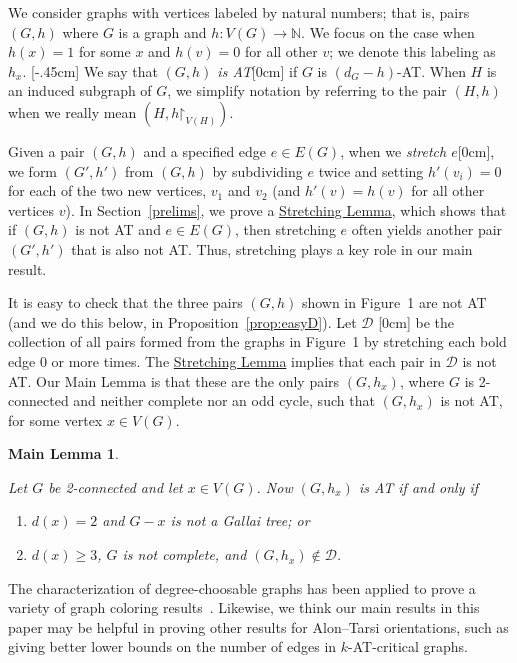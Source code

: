 \documentclass[12pt]{article}
\theoremstyle{plain}
\newtheorem*{mainthm}{Main Lemma}
\theoremstyle{definition}
\theoremstyle{remark}
\newcommand{\fancy}[1]{\mathcal{#1}}
\newcommand{\IN}{\mathbb{N}}
\newcommand{\D}{\fancy{D}}
\newcommand{\func}[3]{#1\colon #2 \rightarrow #3}
\newcommand{\parens}[1]{\left( #1 \right)}
\def\D{\fancy{D}}
\renewcommand{\restriction}{\mathord{\upharpoonright}}
\newcommand{\aside}[1]{\marginnote{\scriptsize{#1}}[0cm]}
\newcommand{\aaside}[2]{\marginnote{\scriptsize{#1}}[#2]}
\begin{document}
	\bigskip
	
	We consider graphs with vertices labeled by natural numbers; that is, pairs
	$(G,h)$ where $G$ is a graph and $\func{h}{V(G)}{\IN}$.  We focus on the case
	when $h(x)=1$ for some $x$ and $h(v)=0$ for all other $v$; we denote this
	labeling as $h_x$. \aaside{$h_x$}{-.45cm}  We say that \emph{$(G, h)$ is
		AT}\aside{$(G,h)$\\ is AT} if $G$ is $(d_G - h)$-AT.
	When $H$ is an induced subgraph of $G$, we simplify notation by referring to
	the pair $(H, h)$ when we really mean $\parens{H, h\restriction_{V(H)}}$.
	
	Given a pair $(G,h)$ and a specified edge $e\in E(G)$, when we \emph{stretch
		$e$}\aside{stretch $e$}, we form $(G',h')$ from $(G,h)$ by subdividing $e$ twice and setting
	$h'(v_i)=0$ for each of the two new vertices, $v_1$ and $v_2$ (and $h'(v)=h(v)$
	for all other vertices $v$).  In Section~\ref{prelims}, we prove a
	\hyperlink{target:SubdivideTwice}{Stretching Lemma}, which shows that if $(G,h)$ is not
	AT and $e\in E(G)$, then stretching $e$ often yields another pair $(G',h')$
	that is also not AT.  Thus, stretching plays a key role in our main result.
	
	It is easy to check that the three pairs $(G,h)$ shown in Figure~1 are not AT
	(and we do this below, in Proposition~\ref{prop:easyD}).  Let $\D$ \aside{$\D$} be the
	collection of all pairs formed from the graphs in Figure~1 by stretching each
	bold edge 0 or more times.  The \hyperlink{target:SubdivideTwice}{Stretching Lemma}
	implies that each pair in $\D$ is not AT.  Our Main Lemma is that these are
	the only pairs $(G,h_x)$, where $G$ is 2-connected and neither complete 
	nor an odd cycle, such that $(G,h_x)$ is not AT, for some vertex $x\in V(G)$.  
	
	\begin{mainthm}
		\hypertarget{target:mainLemma}{}
		Let $G$ be 2-connected and let $x \in V(G)$.
		Now $(G,h_x)$ is AT if and only if
		\begin{enumerate}
			\item[(1)] $d(x)=2$ and $G-x$ is not a Gallai tree; or
			\item[(2)] $d(x)\ge 3$, $G$ is not complete, and $(G,h_x) \not \in \D$.
		\end{enumerate}
	\end{mainthm}
	
	The characterization of degree-choosable graphs has been applied
	to prove a variety of graph coloring
	results~\cite{BohmeMS, CranstonPTV, KostochkaS, KralS, Thomassen-surface}. 
	Likewise, we think our main results in this paper may be helpful in proving
	other results for Alon--Tarsi orientations, such as giving better lower bounds
	on the number of edges in $k$-AT-critical graphs.
	\bigskip
	
\end{document}
